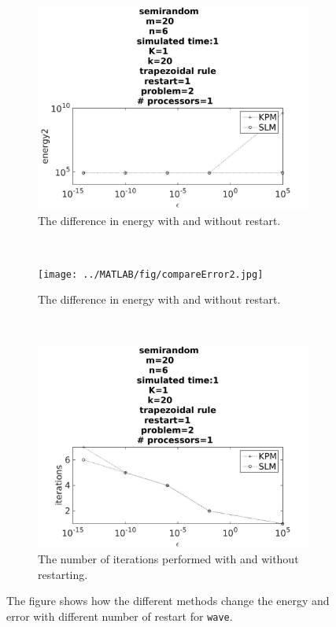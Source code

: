 \begin{figure}[H]
        \begin{subfigure}[b]{0.3\textwidth}
                \includegraphics[width=\textwidth]{../MATLAB/fig/compareEnergy2.jpg}
                \caption{ The difference in energy with and without restart. }
                \label{fig:compareEnergy2}
        \end{subfigure}
        ~
        \begin{subfigure}[b]{0.3\textwidth}
                \texttt{[image: ../MATLAB/fig/compareError2.jpg]}
                \caption{ The difference in energy with and without restart. }
                \label{fig:compareError2}
        \end{subfigure}
        ~
        \begin{subfigure}[b]{0.3\textwidth}
                \includegraphics[width=\textwidth]{../MATLAB/fig/compareIter2.jpg}
                \caption{ The number of iterations performed with and without restarting.  }
                \label{fig:compareIter2}
        \end{subfigure}
        \caption{ The figure shows how the different methods change the energy and error with different number of restart for \texttt{wave}.  }
        \label{fig:compare2}
\end{figure}


